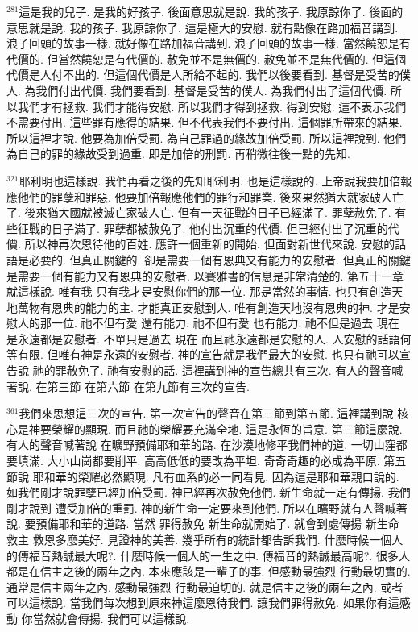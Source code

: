 \documentclass{book}
\begin{document}
$^{281}$這是我的兒子.
是我的好孩子.
後面意思就是說.
我的孩子.
我原諒你了.
後面的意思就是說.
我的孩子.
我原諒你了.
這是極大的安慰.
就有點像在路加福音講到.
浪子回頭的故事一樣.
就好像在路加福音講到.
浪子回頭的故事一樣.
當然饒恕是有代價的.
但當然饒恕是有代價的.
赦免並不是無價的.
赦免並不是無代價的.
但這個代價是人付不出的.
但這個代價是人所給不起的.
我們以後要看到.
基督是受苦的僕人.
為我們付出代價.
我們要看到.
基督是受苦的僕人.
為我們付出了這個代價.
所以我們才有拯救.
我們才能得安慰.
所以我們才得到拯救.
得到安慰.
這不表示我們不需要付出.
這些罪有應得的結果.
但不代表我們不要付出.
這個罪所帶來的結果.
所以這裡才說.
他要為加倍受罰.
為自己罪過的緣故加倍受罰.
所以這裡說到.
他們為自己的罪的緣故受到過重.
即是加倍的刑罰.
再稍微往後一點的先知.

$^{321}$耶利明也這樣說.
我們再看之後的先知耶利明.
也是這樣說的.
上帝說我要加倍報應他們的罪孽和罪惡.
他要加倍報應他們的罪行和罪業.
後來果然猶大就家破人亡了.
後來猶大國就被滅亡家破人亡.
但有一天征戰的日子已經滿了.
罪孽赦免了.
有些征戰的日子滿了.
罪孽都被赦免了.
他付出沉重的代價.
但已經付出了沉重的代價.
所以神再次恩待他的百姓.
應許一個重新的開始.
但面對新世代來說.
安慰的話語是必要的.
但真正關鍵的.
卻是需要一個有恩典又有能力的安慰者.
但真正的關鍵是需要一個有能力又有恩典的安慰者.
以賽雅書的信息是非常清楚的.
第五十一章就這樣說.
唯有我 只有我才是安慰你們的那一位.
那是當然的事情.
也只有創造天地萬物有恩典的能力的主.
才能真正安慰到人.
唯有創造天地沒有恩典的神.
才是安慰人的那一位.
祂不但有愛 還有能力.
祂不但有愛 也有能力.
祂不但是過去 現在 是永遠都是安慰者.
不單只是過去 現在 而且祂永遠都是安慰的人.
人安慰的話語何等有限.
但唯有神是永遠的安慰者.
神的宣告就是我們最大的安慰.
也只有祂可以宣告說 祂的罪赦免了.
祂有安慰的話.
這裡講到神的宣告總共有三次.
有人的聲音喊著說.
在第三節 在第六節 在第九節有三次的宣告.

$^{361}$我們來思想這三次的宣告.
第一次宣告的聲音在第三節到第五節.
這裡講到說 核心是神要榮耀的顯現.
而且祂的榮耀要充滿全地.
這是永恆的旨意.
第三節這麼說.
有人的聲音喊著說 在曠野預備耶和華的路.
在沙漠地修平我們神的道.
一切山窪都要填滿.
大小山崗都要削平.
高高低低的要改為平坦.
奇奇奇趣的必成為平原.
第五節說 耶和華的榮耀必然顯現.
凡有血系的必一同看見.
因為這是耶和華親口說的.
如我們剛才說罪孽已經加倍受罰.
神已經再次赦免他們.
新生命就一定有傳揚.
我們剛才說到 遭受加倍的重罰.
神的新生命一定要來到他們.
所以在曠野就有人聲喊著說.
要預備耶和華的道路.
當然 罪得赦免 新生命就開始了.
就會到處傳揚 新生命 救主 救恩多麼美好.
見證神的美善.
幾乎所有的統計都告訴我們.
什麼時候一個人的傳福音熱誠最大呢?.
什麼時候一個人的一生之中.
傳福音的熱誠最高呢?.
很多人都是在信主之後的兩年之內.
本來應該是一輩子的事.
但感動最強烈 行動最切實的.
通常是信主兩年之內.
感動最強烈 行動最迫切的.
就是信主之後的兩年之內.
或者可以這樣說.
當我們每次想到原來神這麼恩待我們.
讓我們罪得赦免.
如果你有這感動 你當然就會傳揚.
我們可以這樣說.
\end{document}
